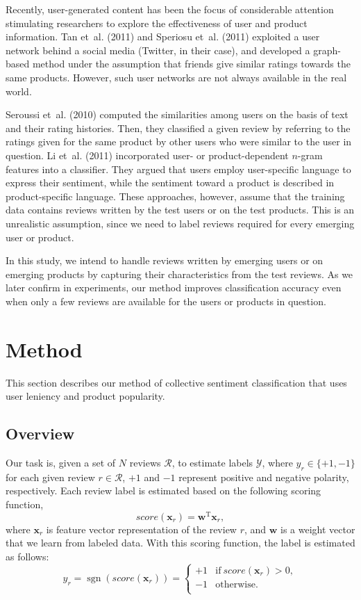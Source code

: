 \documentclass[english]{jnlp_1.4}
\DeclareMathOperator*{\sgn}{sgn}
\begin{document}
Recently, user-generated content has been the focus of considerable attention stimulating researchers to explore the effectiveness of user and product information.
Tan et~al. (2011) and Speriosu et~al. (2011) exploited a user network behind a social media (Twitter, in their case), and developed a graph-based method under the assumption that friends give similar ratings towards  the same products. 
However, such user networks are not always available in the real world.

Seroussi et~al. (2010) computed the
similarities among users on the basis of text and their rating histories. 
Then, they classified a given review by referring to the ratings given for the same product by other users who were similar to the user in question.
Li et~al. (2011) incorporated user- or product-dependent $n$-gram features into a classifier.  
They argued that users employ user-specific language to express their sentiment, while the sentiment toward a product is described in product-specific language.
These approaches, however, assume that the training data contains reviews written by the test users or on the test products. 
This  is an unrealistic assumption, since we need to label reviews required for every emerging user or product. 

In this study, we intend to handle reviews written by emerging users or on emerging products by capturing their characteristics from the test reviews. 
As we later confirm in experiments, our method improves classification accuracy even when only a few reviews are available for the users or products in question.


\section{Method}
\label{sec:method}

This section describes our method of collective sentiment classification that uses user leniency and product popularity. 


\subsection{Overview}

Our task is, given a set of $N$ reviews $\mathcal{R}$, to estimate labels $\mathcal{Y}$, where $y_r
\in \{+1,-1\}$ for each given review $r\in\mathcal{R}$, $+1$ and $-1$ represent positive and negative polarity, respectively. Each review label is estimated based on the following scoring function,
\begin{equation}
score(\boldsymbol{x}_r)= \boldsymbol{w}^\mathrm{T}\boldsymbol{x}_r, \label{eq:fun}
\end{equation}
where $\boldsymbol{x}_r$ is feature vector representation of the review $r$, and $\boldsymbol{w}$ is a weight vector that we learn from labeled data.
With this scoring function, the label is estimated as follows:
\[
y_r=\sgn(\mathit{score}(\boldsymbol{x}_r))=\left\{
\begin{array}{ll}
 +1& \text{if}\ \mathit{score}(\boldsymbol{x}_r)>0,\\
 -1& \text{otherwise}.\\
\end{array}\right.
\]
\end{document}
